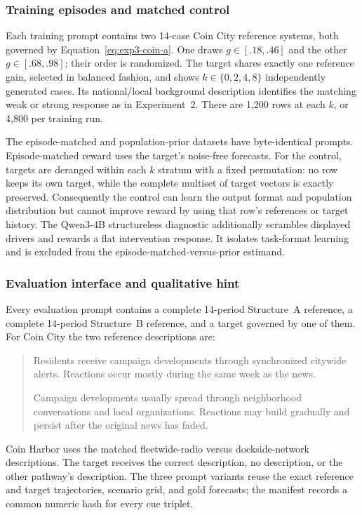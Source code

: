 \subsubsection{Training episodes and matched control}

Each training prompt contains two 14-case Coin City reference systems, both
governed by Equation~\ref{eq:exp3-coin-a}. One draws
$g\in[.18,.46]$ and the other $g\in[.68,.98]$; their order is randomized.
The target shares exactly one reference gain, selected in balanced fashion, and
shows $k\in\{0,2,4,8\}$ independently generated cases. Its national/local
background description identifies the matching weak or strong response as in
Experiment~2. There are 1,200 rows at each $k$, or 4,800 per training run.

The episode-matched and population-prior datasets have byte-identical prompts.
Episode-matched reward uses the target's noise-free forecasts. For the control, targets are
deranged within each $k$ stratum with a fixed permutation: no row keeps its own
target, while the complete multiset of target vectors is exactly preserved.
Consequently the control can learn the output format and population distribution
but cannot improve reward by using that row's references or target history.
The Qwen3-4B structureless diagnostic additionally scrambles displayed drivers
and rewards a flat intervention response. It isolates task-format learning and is
excluded from the episode-matched-versus-prior estimand.



\subsubsection{Evaluation interface and qualitative hint}

Every evaluation prompt contains a complete 14-period Structure~A reference, a
complete 14-period Structure~B reference, and a target governed by one of them.
For Coin City the two reference descriptions are:
\begin{quote}\small
Residents receive campaign developments through synchronized citywide alerts.
Reactions occur mostly during the same week as the news.

Campaign developments usually spread through neighborhood conversations and
local organizations. Reactions may build gradually and persist after the
original news has faded.
\end{quote}
Coin Harbor uses the matched fleetwide-radio versus dockside-network descriptions.
The target receives the correct description, no description, or the other
pathway's description. The three prompt variants reuse the exact reference and
target trajectories, scenario grid, and gold forecasts; the manifest records a
common numeric hash for every cue triplet.

